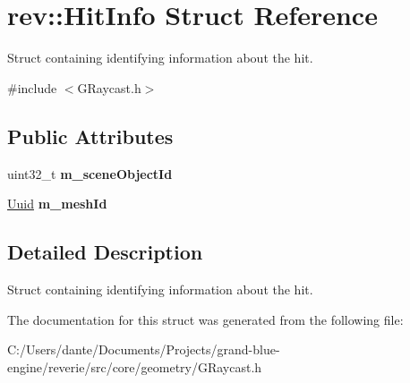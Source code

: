 \hypertarget{structrev_1_1_hit_info}{}\section{rev\+::Hit\+Info Struct Reference}
\label{structrev_1_1_hit_info}


Struct containing identifying information about the hit.  




{\ttfamily \#include $<$G\+Raycast.\+h$>$}

\subsection*{Public Attributes}
\begin{DoxyCompactItemize}
\item 
\mbox{\label{structrev_1_1_hit_info_a559b478ff26ad95f40178de80dc6dca3}} 
uint32\+\_\+t {\bfseries m\+\_\+scene\+Object\+Id}
\item 
\mbox{\label{structrev_1_1_hit_info_af944dfd94a4ccbc08c2101a2f01f2f5d}} 
\mbox{\hyperlink{classrev_1_1_uuid}{Uuid}} {\bfseries m\+\_\+mesh\+Id}
\end{DoxyCompactItemize}


\subsection{Detailed Description}
Struct containing identifying information about the hit. 

The documentation for this struct was generated from the following file\+:\begin{DoxyCompactItemize}
\item 
C\+:/\+Users/dante/\+Documents/\+Projects/grand-\/blue-\/engine/reverie/src/core/geometry/G\+Raycast.\+h\end{DoxyCompactItemize}
